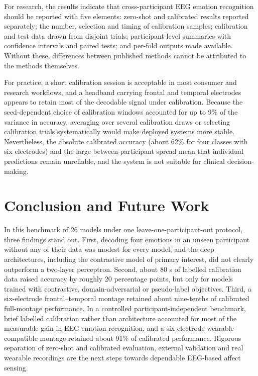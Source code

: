 For research, the results indicate that cross-participant EEG emotion recognition should be reported with five elements: zero-shot and calibrated results reported separately; the number, selection and timing of calibration samples; calibration and test data drawn from disjoint trials; participant-level summaries with confidence intervals and paired tests; and per-fold outputs made available. Without these, differences between published methods cannot be attributed to the methods themselves\cite{tripod,kapoor,demsar}.

For practice, a short calibration session is acceptable in most consumer and research workflows, and a headband carrying frontal and temporal electrodes appears to retain most of the decodable signal under calibration. Because the seed-dependent choice of calibration windows accounted for up to 9\% of the variance in accuracy, averaging over several calibration draws or selecting calibration trials systematically would make deployed systems more stable. Nevertheless, the absolute calibrated accuracy (about 62\% for four classes with six electrodes) and the large between-participant spread mean that individual predictions remain unreliable, and the system is not suitable for clinical decision-making.


\section{Conclusion and Future Work}
In this benchmark of 26 models under one leave-one-participant-out protocol, three findings stand out. First, decoding four emotions in an unseen participant without any of their data was modest for every model, and the deep architectures, including the contrastive model of primary interest, did not clearly outperform a two-layer perceptron. Second, about 80 s of labelled calibration data raised accuracy by roughly 20 percentage points, but only for models trained with contrastive, domain-adversarial or pseudo-label objectives. Third, a six-electrode frontal–temporal montage retained about nine-tenths of calibrated full-montage performance. In a controlled participant-independent benchmark, brief labelled calibration rather than architecture accounted for most of the measurable gain in EEG emotion recognition, and a six-electrode wearable-compatible montage retained about 91\% of calibrated performance. Rigorous separation of zero-shot and calibrated evaluation, external validation and real wearable recordings are the next steps towards dependable EEG-based affect sensing.


